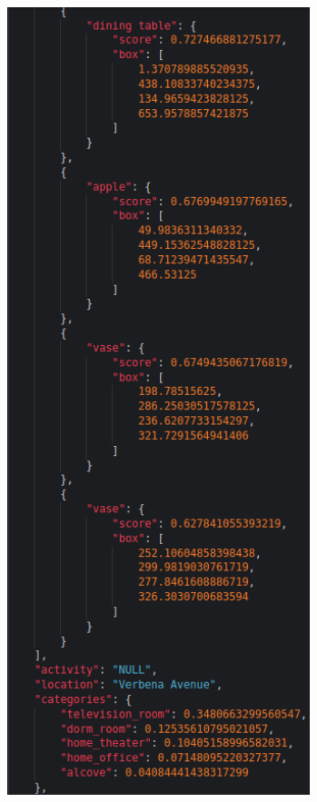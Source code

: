 \begin{figure}[H]
\begin{subfigure}{0.3\textwidth}
      \end{subfigure}
      \begin{subfigure}{0.3\textwidth}
      \includegraphics[width=0.968\textwidth]{Sections/4InitialWork/4_images_random/res2.png}

\end{subfigure}
\end{figure}
